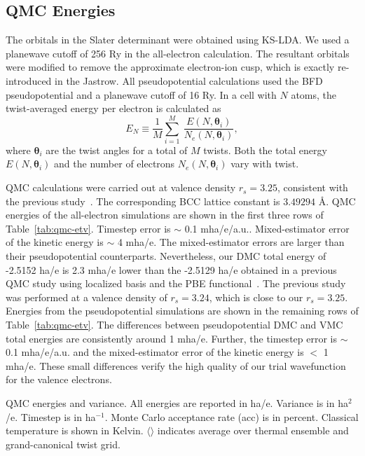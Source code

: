 \documentclass[aps,prl,superscriptaddress]{revtex4-1}
\newcommand{\bs}{\boldsymbol}
\begin{document}
\subsection{QMC Energies}

The orbitals in the Slater determinant were obtained using KS-LDA. We used a planewave cutoff of 256 Ry in the all-electron calculation. The resultant orbitals were modified to remove the approximate electron-ion cusp, which is exactly re-introduced in the Jastrow. All pseudopotential calculations used the BFD pseudopotential and a planewave cutoff of 16 Ry.
In a cell with $N$ atoms, the twist-averaged energy per electron is calculated as
\begin{equation}
E_N \equiv \frac{1}{M}\sum\limits_{i=1}^{M}~\dfrac{E(N, \bs{\theta}_i)}{N_e(N, \bs{\theta}_i)},
\end{equation}
where $\bs{\theta}_i$ are the twist angles for a total of $M$ twists. Both the total energy $E(N, \bs{\theta}_i)$ and the number of electrons $N_e(N, \bs{\theta}_i)$ vary with twist.

QMC calculations were carried out at valence density $r_s=3.25$, consistent with the previous study~\cite{Filippi1999}.
The corresponding BCC lattice constant is $3.49294$ \AA.
QMC energies of the all-electron simulations are shown in the first three rows of Table~\ref{tab:qmc-etv}. Timestep error is $\sim$ 0.1 mha/e/a.u.. Mixed-estimator error of the kinetic energy is $\sim$ 4 mha/e. The mixed-estimator errors are larger than their pseudopotential counterparts. Nevertheless, our DMC total energy of -2.5152 ha/e is 2.3 mha/e lower than the -2.5129 ha/e obtained in a previous QMC study using localized basis and the PBE functional~\cite{Rasch2015}. The previous study was performed at a valence density of $r_s=3.24$, which is close to our $r_s=3.25$.
Energies from the pseudopotential simulations are shown in the remaining rows of Table~\ref{tab:qmc-etv}. The differences between pseudopotential DMC and VMC total energies are consistently around 1 mha/e. Further, the timestep error is $\sim$ 0.1 mha/e/a.u. and the mixed-estimator error of the kinetic energy is $<$ 1 mha/e. These small differences verify the high quality of our trial wavefunction for the valence electrons.

\begin{table}[h]
\caption{QMC energies and variance. All energies are reported in ha/e. Variance is in ha$^2$/e. Timestep is in ha$^{-1}$. Monte Carlo acceptance rate (acc) is in percent. Classical temperature is shown in Kelvin. $\langle\rangle$ indicates average over thermal ensemble and grand-canonical twist grid.}

\label{tab:qmc-etv}
\end{table}
\end{document}
